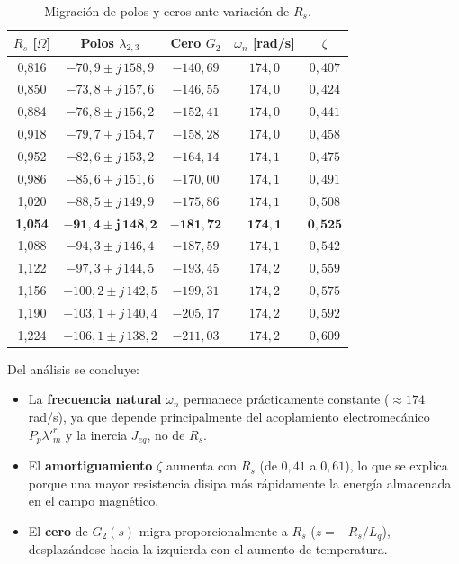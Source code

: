 \documentclass[12pt, a4paper,journal, onecolumn, compsoc]{IEEEtran}
\begin{document}
\begin{table}[H]
\centering
\caption{Migración de polos y ceros ante variación de $R_s$.}
\label{tab:migracion_Rs}
\renewcommand{\arraystretch}{1.2}
\footnotesize
\begin{tabular}{|c|c|c|c|c|}
\hline
$R_s$ [$\Omega$] & Polos $\lambda_{2,3}$ & Cero $G_2$ & $\omega_n$ [rad/s] & $\zeta$ \\
\hline
0{,}816 & $-70{,}9 \pm j\,158{,}9$ & $-140{,}69$ & $174{,}0$ & $0{,}407$ \\
0{,}850 & $-73{,}8 \pm j\,157{,}6$ & $-146{,}55$ & $174{,}0$ & $0{,}424$ \\
0{,}884 & $-76{,}8 \pm j\,156{,}2$ & $-152{,}41$ & $174{,}0$ & $0{,}441$ \\
0{,}918 & $-79{,}7 \pm j\,154{,}7$ & $-158{,}28$ & $174{,}0$ & $0{,}458$ \\
0{,}952 & $-82{,}6 \pm j\,153{,}2$ & $-164{,}14$ & $174{,}1$ & $0{,}475$ \\
0{,}986 & $-85{,}6 \pm j\,151{,}6$ & $-170{,}00$ & $174{,}1$ & $0{,}491$ \\
1{,}020 & $-88{,}5 \pm j\,149{,}9$ & $-175{,}86$ & $174{,}1$ & $0{,}508$ \\
\textbf{1{,}054} & $\mathbf{-91{,}4 \pm j\,148{,}2}$ & $\mathbf{-181{,}72}$ & $\mathbf{174{,}1}$ & $\mathbf{0{,}525}$ \\
1{,}088 & $-94{,}3 \pm j\,146{,}4$ & $-187{,}59$ & $174{,}1$ & $0{,}542$ \\
1{,}122 & $-97{,}3 \pm j\,144{,}5$ & $-193{,}45$ & $174{,}2$ & $0{,}559$ \\
1{,}156 & $-100{,}2 \pm j\,142{,}5$ & $-199{,}31$ & $174{,}2$ & $0{,}575$ \\
1{,}190 & $-103{,}1 \pm j\,140{,}4$ & $-205{,}17$ & $174{,}2$ & $0{,}592$ \\
1{,}224 & $-106{,}1 \pm j\,138{,}2$ & $-211{,}03$ & $174{,}2$ & $0{,}609$ \\
\hline
\end{tabular}
\end{table}

Del análisis se concluye:
\begin{itemize}
    \item La \textbf{frecuencia natural} $\omega_n$ permanece prácticamente constante ($\approx 174$ rad/s), ya que depende principalmente del acoplamiento electromecánico $P_p\lambda'^r_m$ y la inercia $J_{eq}$, no de $R_s$.
    \item El \textbf{amortiguamiento} $\zeta$ aumenta con $R_s$ (de $0{,}41$ a $0{,}61$), lo que se explica porque una mayor resistencia disipa más rápidamente la energía almacenada en el campo magnético.
    \item El \textbf{cero} de $G_2(s)$ migra proporcionalmente a $R_s$ ($z = -R_s/L_q$), desplazándose hacia la izquierda con el aumento de temperatura.
\end{itemize}
\end{document}
